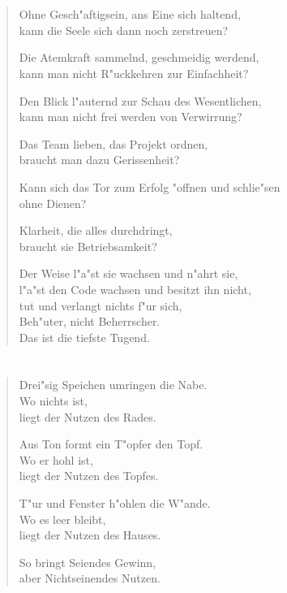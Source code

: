 \documentclass[a4paper,10pt,openany]{book}
\begin{document}
\chapter{}
\begin{verse}
Ohne Gesch"aftigsein, ans Eine sich haltend,\\
kann die Seele sich dann noch zerstreuen?

Die Atemkraft sammelnd, geschmeidig werdend,\\
kann man nicht R"uckkehren zur Einfachheit?

Den Blick l"auternd zur Schau des Wesentlichen,\\
kann man nicht frei werden von Verwirrung?

Das Team lieben, das Projekt ordnen,\\
braucht man dazu Gerissenheit?

Kann sich das Tor zum Erfolg "offnen und schlie"sen\\
ohne Dienen?

Klarheit, die alles durchdringt,\\
braucht sie Betriebsamkeit?

Der Weise l"a"st sie wachsen und n"ahrt sie,\\
l"a"st den Code wachsen und besitzt ihn nicht,\\
tut und verlangt nichts f"ur sich,\\
Beh"uter, nicht Beherrscher.\\
Das ist die tiefste Tugend.
\end{verse}

\chapter{}
\begin{verse}
    Drei"sig Speichen umringen die Nabe.\\
    Wo nichts ist,\\
    liegt der Nutzen des Rades.

    Aus Ton formt ein T"opfer den Topf.\\
    Wo er hohl ist,\\
    liegt der Nutzen des Topfes.

    T"ur und Fenster h"ohlen die W"ande.\\
    Wo es leer bleibt,\\
    liegt der Nutzen des Hauses.

    So bringt Seiendes Gewinn,\\
    aber Nichtseinendes Nutzen.
\end{verse}
\end{document}

